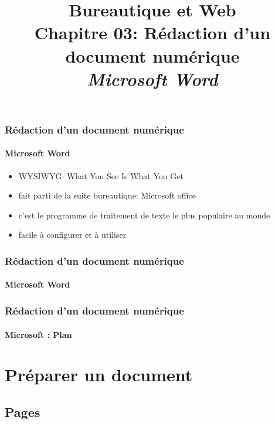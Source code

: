 \documentclass[xcolor=table]{beamer}
\title[BWEB: 03- Rédaction (Microsoft Word)] %
{Bureautique et Web \\Chapitre 03: Rédaction d'un document numérique \\ \slshape\small  Microsoft Word}
\begin{document}
\begin{frame}
\frametitle{Rédaction d'un document numérique}
\framesubtitle{Microsoft Word}

\begin{itemize}
	\item WYSIWYG: What You See Is What You Get
	\item fait parti de la suite bureautique: Microsoft office
	\item c'est le programme de traitement de texte le plus populaire au monde
	\item facile à configurer et à utiliser 
	
\end{itemize}

\end{frame}

\begin{frame}
\frametitle{Rédaction d'un document numérique}
\framesubtitle{Microsoft Word}

\begin{center}
\end{center}

\end{frame}

\begin{frame}
\frametitle{Rédaction d'un document numérique}
\framesubtitle{Microsoft : Plan}

\begin{multicols}{2}
	\tableofcontents
\end{multicols}
\end{frame}

\section{Préparer un document}

%

\subsection{Pages}
\end{document}
